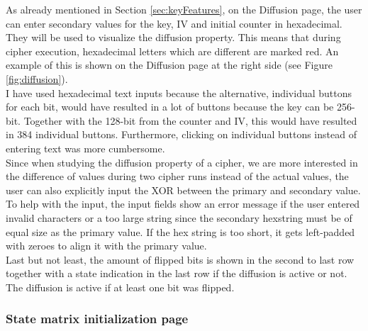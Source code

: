 As already mentioned in Section \ref{sec:keyFeatures}, on the Diffusion page, the user can enter secondary values for the key, IV and initial counter in hexadecimal. They will be used to visualize the diffusion property. This means that during cipher execution, hexadecimal letters which are different are marked red. An example of this is shown on the Diffusion page at the right side (see Figure \ref{fig:diffusion}).\\
I have used hexadecimal text inputs because the alternative, individual buttons for each bit, would have resulted in a lot of buttons because the key can be 256-bit. Together with the 128-bit from the counter and IV, this would have resulted in 384 individual buttons. Furthermore, clicking on individual buttons instead of entering text was more cumbersome. {\color{red} \\
Since when studying the diffusion property of a cipher, we are more interested in the difference of values during two cipher runs instead of the actual values, the user can also explicitly input the XOR between the primary and secondary value.} \\
To help with the input, the input fields show an error message if the user entered invalid characters or a too large string since the secondary hexstring must be of equal size as the primary value. If the hex string is too short, it gets left-padded with zeroes to align it with the primary value. \\
Last but not least, the amount of flipped bits is shown in the second to last row together with a state indication in the last row if the diffusion is active or not. The diffusion is active if at least one bit was flipped.

\subsubsection{State matrix initialization page}

